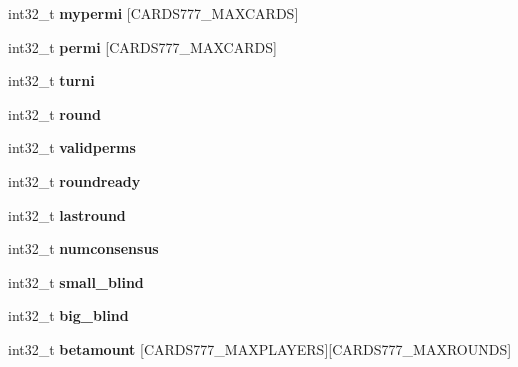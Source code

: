 \begin{DoxyCompactItemize}
\item 
\mbox{\label{structprivatebet__vars_acd3817a80f1de7845e27291c550b0e92}} 
int32\+\_\+t {\bfseries mypermi} \mbox{[}C\+A\+R\+D\+S777\+\_\+\+M\+A\+X\+C\+A\+R\+DS\mbox{]}
\item 
\mbox{\label{structprivatebet__vars_ab84d5fd502ed68296043e4b42a19398f}} 
int32\+\_\+t {\bfseries permi} \mbox{[}C\+A\+R\+D\+S777\+\_\+\+M\+A\+X\+C\+A\+R\+DS\mbox{]}
\item 
\mbox{\label{structprivatebet__vars_a9bda4d6f988f69e54218f62c3bcd1233}} 
int32\+\_\+t {\bfseries turni}
\item 
\mbox{\label{structprivatebet__vars_a184f9ce3af1e6e3b08aa2e6d9b0cdbf1}} 
int32\+\_\+t {\bfseries round}
\item 
\mbox{\label{structprivatebet__vars_a73fcbc896674210a5223a4882ac4155b}} 
int32\+\_\+t {\bfseries validperms}
\item 
\mbox{\label{structprivatebet__vars_ad73f44b3265d431c0c24ae28c4e13f72}} 
int32\+\_\+t {\bfseries roundready}
\item 
\mbox{\label{structprivatebet__vars_a790a7f2f8be1750bdf9cb427757e05cb}} 
int32\+\_\+t {\bfseries lastround}
\item 
\mbox{\label{structprivatebet__vars_ae78c3f094c017e1eceb76b38a9191f12}} 
int32\+\_\+t {\bfseries numconsensus}
\item 
\mbox{\label{structprivatebet__vars_a6ceca0aa346ee52a267954a93a0310d5}} 
int32\+\_\+t {\bfseries small\+\_\+blind}
\item 
\mbox{\label{structprivatebet__vars_ae12d2ae74edbf729a736f7ab11479757}} 
int32\+\_\+t {\bfseries big\+\_\+blind}
\item 
\mbox{\label{structprivatebet__vars_ad76c9dddaf0a04d2ebb1e9ee95d3c8af}} 
int32\+\_\+t {\bfseries betamount} \mbox{[}C\+A\+R\+D\+S777\+\_\+\+M\+A\+X\+P\+L\+A\+Y\+E\+RS\mbox{]}\mbox{[}C\+A\+R\+D\+S777\+\_\+\+M\+A\+X\+R\+O\+U\+N\+DS\mbox{]}

\end{DoxyCompactItemize}
